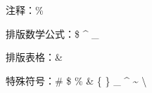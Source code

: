 \documentclass{ctexart}
\begin{document}
注释：\%

排版数学公式：\$ \^{} \_

排版表格：\&

特殊符号：\# \$ \% \& \{ \} \_
\^{} \~{} \textbackslash
\end{document}
